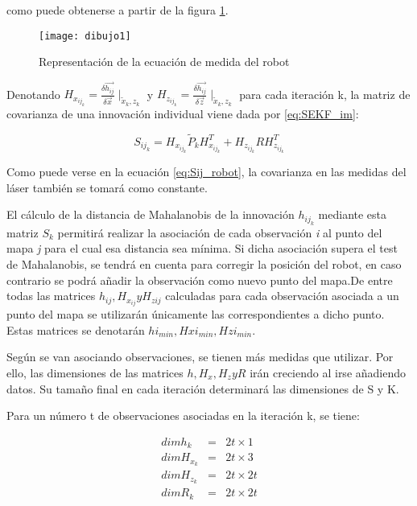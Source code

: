 \noindent
como puede obtenerse a partir de la figura \ref{fg:medidas}.

\begin{figure}[h]
  \centering\texttt{[image: dibujo1]}\\
  \caption{Representación de la ecuación de medida del robot}\label{fg:medidas}
\end{figure}


Denotando $H_{x_{ij_{k}}} = \frac{\delta \vec{h_{ij}}}{\delta \vec{x}}\mid _{\tilde{x}_k,z_{k}}$ y $H_{z_{ij_{k}}} = \frac{\delta \vec{h_{ij}}}{\delta \vec{z}}\mid _{\tilde{x}_k,z_{k}}$ para cada iteración k, la matriz de covarianza de una innovación individual viene dada por \ref{eq:SEKF_im}:

\begin{equation}\label{eq:Sij_robot}
    S_{ij_{k}} = H_{x_{ij_{k}}}\tilde{P}_{k}H_{x_{ij_{k}}}^{T}+H_{z_{ij_{k}}}RH_{z_{ij_{k}}}^{T}
\end{equation}

Como puede verse en la ecuación \ref{eq:Sij_robot}, la covarianza en las medidas del láser también se tomará como constante.

El cálculo de la distancia de Mahalanobis de la innovación $h_{ij_{k}}$ mediante esta matriz $S_{k}$ permitirá realizar la asociación de cada observación \emph{i} al punto del mapa \emph{j} para el cual esa distancia sea mínima. Si dicha asociación supera el test de Mahalanobis, se tendrá en cuenta para corregir la posición del robot, en caso contrario se podrá añadir la observación como nuevo punto del mapa.De entre todas las matrices $h_{ij}, H_{x_{ij}} y H_{z{ij}}$ calculadas para cada observación asociada a un punto del mapa se utilizarán únicamente las correspondientes a dicho punto. Estas matrices se denotarán $hi_{min}, Hxi_{min}, Hzi_{min}$.

Según se van asociando observaciones, se tienen más medidas que utilizar. Por ello, las dimensiones de las matrices $h, H_{x}, H_{z} y R$ irán creciendo al irse añadiendo datos. Su tamaño final en cada iteración determinará las dimensiones de S y K.

Para un número t de observaciones asociadas en la iteración k, se tiene:

\begin{eqnarray*}
dim  h_{k}             &=  & 2t \times 1 \\
dim  H_{x_{k}}     & = & 2t \times 3 \\
dim H_{z_{k}}      & = & 2t \times 2t \\
dim R_{k}             & = & 2t \times 2t
\end{eqnarray*}

